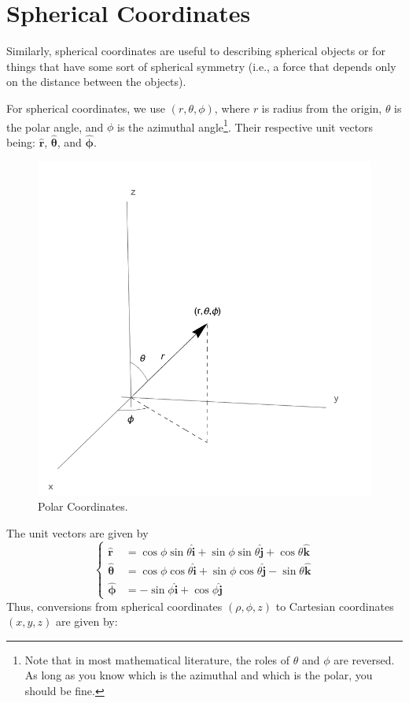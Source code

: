 \documentclass[oneside]{book}
\numberwithin{figure}{section}
\numberwithin{equation}{section}
\newcommand{\bhat}[1]{\bm{\hat{#1}}}
\theoremstyle{definition}
\begin{document}
	\section{Spherical Coordinates}
	Similarly, spherical coordinates are useful to describing spherical objects or for things that have some sort of spherical symmetry (i.e., a force that depends only on the distance between the objects).
	
	For spherical coordinates, we use $ (r, \theta, \phi) $, where $ r $ is radius from the origin, $ \theta $ is the polar angle, and $ \phi $ is the azimuthal angle\footnote{Note that in most mathematical literature, the roles of $ \theta $ and $ \phi $ are reversed. As long as you know which is the azimuthal and which is the polar, you should be fine.}. Their respective unit vectors being: $ \bhat{r} $, $ \bhat{\theta} $, and $ \bhat{\phi} $.
	\begin{figure}[H]
		\centering
		\includegraphics[width=0.6\columnwidth]{Figures/Coordinates/Polar Coordinates.pdf}
		\caption{Polar Coordinates.}
		\label{fig:polar}
	\end{figure}
	The unit vectors are given by
	\begin{equation}
		\begin{cases}
			\bhat{r} &= \cos\phi\sin\theta\bhat{i} + \sin\phi\sin\theta\bhat{j} + \cos\theta\bhat{k}\\
			\bhat{\theta} &= \cos\phi\cos\theta\bhat{i} + \sin\phi\cos\theta\bhat{j} - \sin\theta\bhat{k}\\
			\bhat{\phi} &= -\sin\phi\bhat{i} + \cos\phi\bhat{j}
		\end{cases}
	\end{equation}
	Thus, conversions from spherical coordinates $ (\rho, \phi, z) $ to Cartesian coordinates $ (x,y,z) $ are given by:
\end{document}
